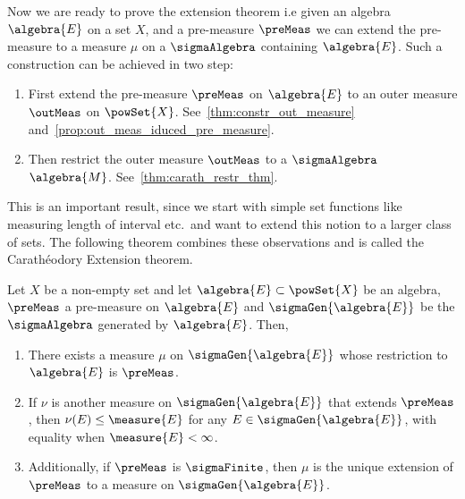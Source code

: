 Now we are ready to prove the extension theorem i.e given an algebra $\algebra{E}$ on a set $X$,
and a pre-measure $\preMeas$ we can extend
the pre-measure to a measure $\mu$ on a $\sigmaAlgebra$ containing $\algebra{E}$.
Such a construction can be achieved in two step:
\begin{enumerate}
    \item
	First extend the pre-measure $\preMeas$ on $\algebra{E}$ to an outer measure $\outMeas$ on
	$\powSet{X}$. See~\ref{thm:constr_out_measure}
	and~\ref{prop:out_meas_iduced_pre_measure}.
    \item
	Then restrict the outer measure $\outMeas$ to a $\sigmaAlgebra$ $\algebra{M}$.
	See~\ref{thm:carath_restr_thm}.
\end{enumerate}
This is an important result, since we start with simple set functions like measuring length of 
interval etc.\ and want to extend this notion to a larger class of sets. The following theorem
combines these observations and is called the Carath{\'e}odory Extension theorem.
\begin{Theorem}[name=Carath{\'e}odory Extension Theorem]\label{thm:carath_ext_thm}
    Let $X$ be a non-empty set and let $\algebra{E} \subset \powSet{X}$ be an algebra, $\preMeas$ a
    pre-measure on $\algebra{E}$ and $\sigmaGen{\algebra{E}}$ be the $\sigmaAlgebra$ generated by
    $\algebra{E}$. Then,
    \begin{enumerate}
	\item
	    There exists a measure $\mu$ on $\sigmaGen{\algebra{E}}$ whose restriction to
	    $\algebra{E}$ is $\preMeas$.
	\item
	    If $\nu$ is another measure on $\sigmaGen{\algebra{E}}$ that extends $\preMeas$, then
	    $\nu(E) \leq \measure{E}$ for any $E \in \sigmaGen{\algebra{E}}$, with equality when
	    $\measure{E} < \infty$. 
	\item
	    Additionally, if $\preMeas$ is $\sigmaFinite$, then $\mu$ is the unique extension of
	    $\preMeas$ to a measure on $\sigmaGen{\algebra{E}}$.
    \end{enumerate}
\end{Theorem}
